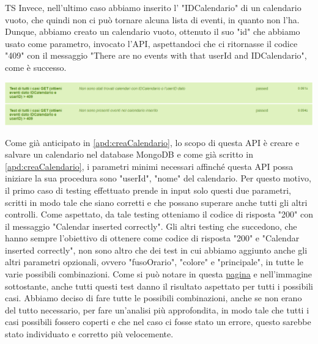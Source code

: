\begin{listaPersonale}{TS}
                Invece, nell'ultimo caso abbiamo inserito l' "IDCalendario" di un calendario vuoto, che quindi non ci può tornare alcuna lista di eventi, in quanto non l'ha. Dunque, abbiamo creato un calendario vuoto, ottenuto il suo "id" che abbiamo usato come parametro, invocato l'API, aspettandoci che ci ritornasse il codice "409" con il messaggio "There are no events with that userId and IDCalendario", come è successo.
                \begin{center}
                        \includegraphics[width=1\textwidth, height=0.09\textheight]{img/png/tests/EventoGet/409_getEventi.png}
                \end{center}
                Come già anticipato in \ref{apd:creaCalendario}, lo scopo di questa API è creare e salvare un calendario nel database MongoDB e come già scritto in \ref{apd:creaCalendario}, i parametri minimi necessari affinché questa API possa iniziare la sua procedura sono "userId", "nome" del calendario. Per questo motivo, il primo caso di testing effettuato prende in input solo questi due parametri, scritti in modo tale che siano corretti e che possano superare anche tutti gli altri controlli. Come aspettato, da tale testing otteniamo il codice di risposta "200" con il messaggio "Calendar inserted correctly". Gli altri testing che succedono, che hanno sempre l'obiettivo di ottenere come codice di risposta "200" e "Calendar inserted correctly", non sono altro che dei test in cui abbiamo aggiunto anche gli altri parametri opzionali, ovvero "fusoOrario", "colore" e "principale", in tutte le varie possibili combinazioni. Come si può notare in questa \href{https://plan-it.it/test-report.html} {pagina} e nell'immagine sottostante, anche tutti questi test danno il risultato aspettato per tutti i possibili casi. Abbiamo deciso di fare tutte le possibili combinazioni, anche se non erano del tutto necessario, per fare un'analisi più approfondita, in modo tale che tutti i casi possibili fossero coperti e che nel caso ci fosse stato un errore, questo sarebbe stato individuato e corretto più velocemente.

\end{listaPersonale}
